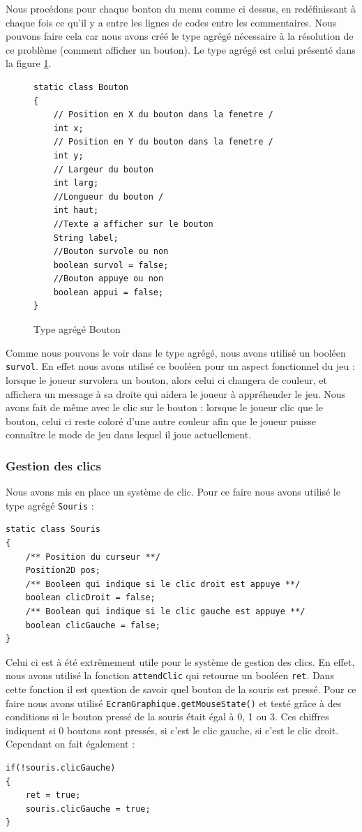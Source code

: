\documentclass[]{article}
\newcommand{\variable}[1]{\noindent \texttt{#1}}
\begin{document}
Nous procédons pour chaque bonton du menu comme ci dessus, en redéfinissant à chaque fois ce qu'il y a entre les lignes de codes entre les commentaires. Nous pouvons faire cela car nous avons créé le type agrégé nécessaire à la résolution de ce problème (comment afficher un bouton). Le type agrégé est celui présenté dans la figure \no\ref{Type agrégé Bouton}.

\begin{figure}[hpt]
	\center
	\caption{\label{Type agrégé Bouton} Type agrégé Bouton}
\begin{lstlisting}
static class Bouton
{
    // Position en X du bouton dans la fenetre /
    int x;
    // Position en Y du bouton dans la fenetre /
    int y;
    // Largeur du bouton 
    int larg;
    //Longueur du bouton /
    int haut;
    //Texte a afficher sur le bouton 
    String label;
    //Bouton survole ou non 
    boolean survol = false;
    //Bouton appuye ou non 
    boolean appui = false;
} 
\end{lstlisting}
\end{figure}

Comme nous pouvons le voir dans le type agrégé, nous avons utilisé un booléen \variable{survol}. En effet nous avons utilisé ce booléen pour un aspect fonctionnel du jeu : lorsque le joueur survolera un bouton, alors celui ci changera de couleur, et affichera un message à sa droite qui aidera le joueur à appréhender le jeu. Nous avons fait de même avec le clic sur le bouton : lorsque le joueur clic que le bouton, celui ci reste coloré d'une autre couleur afin que le joueur puisse connaître le mode de jeu dans lequel il joue actuellement.
 
\subsubsection{Gestion des clics}

Nous avons mis en place un système de clic. Pour ce faire nous avons utilisé le type agrégé \variable{Souris} : 

\begin{lstlisting}
static class Souris
{
    /** Position du curseur **/
    Position2D pos;
    /** Booleen qui indique si le clic droit est appuye **/
    boolean clicDroit = false;
    /** Boolean qui indique si le clic gauche est appuye **/
    boolean clicGauche = false;
}
\end{lstlisting}

Celui ci est à été extrêmement utile pour le système de gestion des clics. En effet, 
nous avons utilisé la fonction \variable{attendClic} qui retourne un booléen \variable{ret}. Dans cette fonction il est question de savoir quel bouton de la souris est pressé. Pour ce faire nous avons utilisé \variable{EcranGraphique.getMouseState()} et testé grâce à des conditions si le bouton pressé de la souris était égal à 0, 1 ou 3. Ces chiffres indiquent si 0 boutons sont pressés, si c'est le clic gauche, si c'est le clic droit. Cependant on fait également : 
\begin{lstlisting}
if(!souris.clicGauche)
{
    ret = true;
    souris.clicGauche = true;
}
\end{lstlisting}
\end{document}
